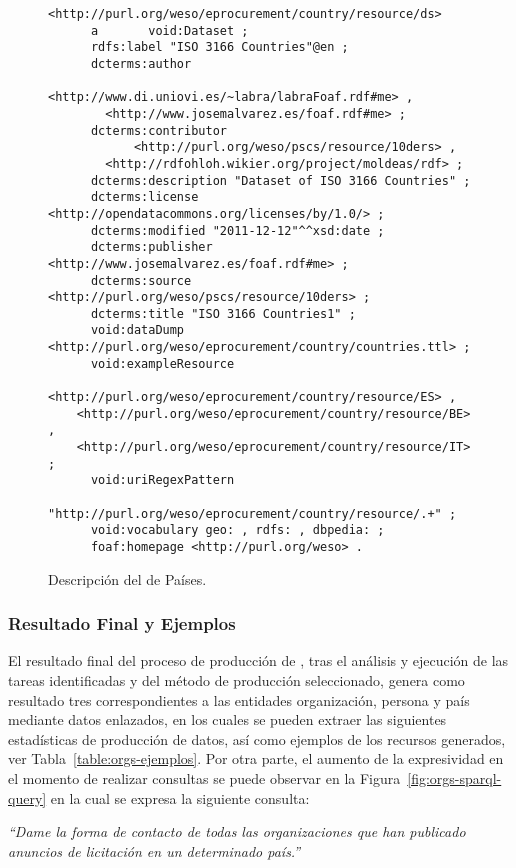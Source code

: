 \begin{figure}[!htp]
\begin{lstlisting} 
<http://purl.org/weso/eprocurement/country/resource/ds>
      a       void:Dataset ;
      rdfs:label "ISO 3166 Countries"@en ;
      dcterms:author 
            <http://www.di.uniovi.es/~labra/labraFoaf.rdf#me> , 
	    <http://www.josemalvarez.es/foaf.rdf#me> ;
      dcterms:contributor
            <http://purl.org/weso/pscs/resource/10ders> ,
	    <http://rdfohloh.wikier.org/project/moldeas/rdf> ;
      dcterms:description "Dataset of ISO 3166 Countries" ;
      dcterms:license <http://opendatacommons.org/licenses/by/1.0/> ;
      dcterms:modified "2011-12-12"^^xsd:date ;
      dcterms:publisher <http://www.josemalvarez.es/foaf.rdf#me> ;
      dcterms:source <http://purl.org/weso/pscs/resource/10ders> ;
      dcterms:title "ISO 3166 Countries1" ;
      void:dataDump <http://purl.org/weso/eprocurement/country/countries.ttl> ;
      void:exampleResource
        <http://purl.org/weso/eprocurement/country/resource/ES> , 
	<http://purl.org/weso/eprocurement/country/resource/BE> , 
	<http://purl.org/weso/eprocurement/country/resource/IT> ;
      void:uriRegexPattern
        "http://purl.org/weso/eprocurement/country/resource/.+" ;
      void:vocabulary geo: , rdfs: , dbpedia: ;
      foaf:homepage <http://purl.org/weso> .
\end{lstlisting}
	\caption{Descripción del \dataset de Países.}
	\label{fig:countries-ds}
\end{figure}



\subsubsection{Resultado Final y Ejemplos}
El resultado final del proceso de producción de \linkeddata, tras el análisis y ejecución 
de las tareas identificadas y del método de producción seleccionado, genera como resultado tres \datasets correspondientes 
a las entidades organización, persona y país mediante datos enlazados, en los cuales se pueden extraer las siguientes 
estadísticas de producción de datos, así como ejemplos de los recursos generados, ver Tabla~\ref{table:orgs-ejemplos}. Por otra parte, 
el aumento de la expresividad en el momento de realizar consultas se puede observar en la Figura~\ref{fig:orgs-sparql-query} en la 
cual se expresa la siguiente consulta:

\begin{Frame}
\textit{``Dame la forma de contacto de todas las organizaciones que han publicado anuncios de licitación en un determinado país.''}
\end{Frame}


